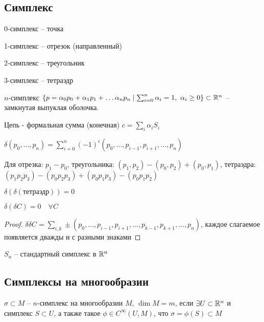   \subsection*{Симплекс}

  0-симплекс -- точка

  1-симплекс -- отрезок (направленный)

  2-симплекс -- треугольник 
  
  3-симплекс -- тетраэдр

  \begin{definition}
    $n$-симплекс $\{ p = \alpha_0p_0 + \alpha_1p_1 + \dotsc \alpha_n p_n \mid \sum^n_{i=0} \alpha_i = 1, \ \alpha_i \ge 0 \} \subset \mathbb{R}^n$ -- замкнутая выпуклая оболочка.
  \end{definition}
  \begin{definition}
    Цепь - формальная сумма (конечная) $c = \sum_i \alpha_iS_i$
  \end{definition}
  \begin{definition}
    $\delta(p_0, \dotsc, p_n) = \sum^n_{i=0} (-1)^i(p_0, \dotsc, p_{i-1}, p_{i+1}, \dotsc, p_n)$
  \end{definition}
  Для отрезка: $p_1 - p_0$, треугольника: $(p_1, p_2) - (p_0, p_2) + (p_0, p_1)$, тетраэдра:$(p_1 p_2 p_3) - (p_0 p_2 p_3) + (p_0 p_1 p_3) - (p_0 p_1 p_2)$

  $\delta(\delta(\text{тетраэдр})) = 0$

  \begin{theorem}
    $\delta(\delta C) = 0 \quad \forall C$
  \end{theorem}
  \begin{proof}
    $\delta\delta C = \sum_{i,k} \pm (p_0, \dotsc, p_{i-1}, p_{i+1}, \dotsc, p_{k-1}, p_{k+1}, \dotsc, p_n)$, каждое слагаемое появляется дважды и с разными знаками
  \end{proof}

  $S_n$ -- стандартный симплекс в $\mathbb{R}^n$

  
  \subsection*{Симплексы на многообразии}

  \begin{definition}
    $\sigma \subset M$ -- $n$-симплекс на многообразии $M$, $\dim M = m$, если $\exists U \subset \mathbb{R}^n$ и симплекс $S \subset U$, а также такое $\phi \in C^\infty(U, M)$, что $\sigma = \phi(S) \subset M$

  \end{definition}

